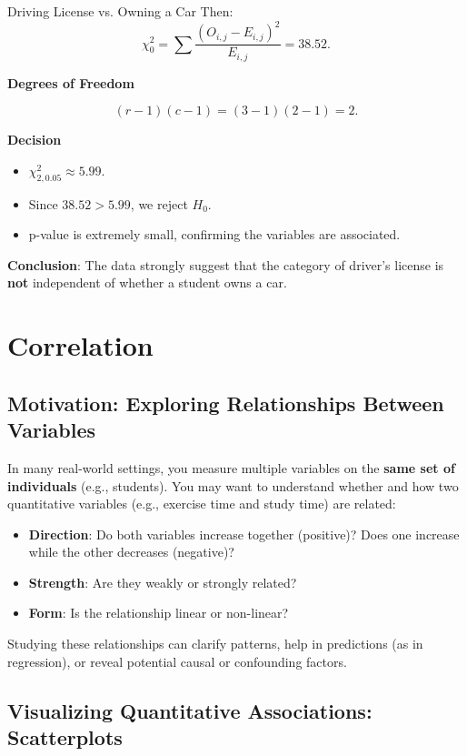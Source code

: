 \documentclass[10pt, total={6in, 8in}]{extarticle}
\begin{document}
\begin{examplebox}{Driving License vs. Owning a Car}{}
    Then:
    \[
        \chi^2_0
        = \sum \frac{(O_{i,j} - E_{i,j})^2}{E_{i,j}}
        = 38.52.
    \]

    \textbf{Degrees of Freedom}

    \[
        (r - 1)(c - 1) = (3 - 1)(2 - 1) = 2.
    \]

    \textbf{Decision}

    \begin{itemize}
        \item $\chi^2_{2,0.05}\approx 5.99$.
        \item Since $38.52 > 5.99$, we reject $H_0$.
        \item p-value is extremely small, confirming the variables are associated.
    \end{itemize}

    \textbf{Conclusion}: The data strongly suggest that the category of driver's license is \textbf{not} independent of whether a student owns a car.
\end{examplebox}


\section{Correlation}
\subsection{Motivation: Exploring Relationships Between Variables}

In many real-world settings, you measure multiple variables on the \textbf{same set of individuals} (e.g., students). You may want to understand whether and how two quantitative variables (e.g., exercise time and study time) are related:
\begin{itemize}
    \item \textbf{Direction}: Do both variables increase together (positive)? Does one increase while the other decreases (negative)?
    \item \textbf{Strength}: Are they weakly or strongly related?
    \item \textbf{Form}: Is the relationship linear or non-linear?
\end{itemize}

Studying these relationships can clarify patterns, help in predictions (as in regression), or reveal potential causal or confounding factors.



\subsection{Visualizing Quantitative Associations: Scatterplots}
\end{document}

